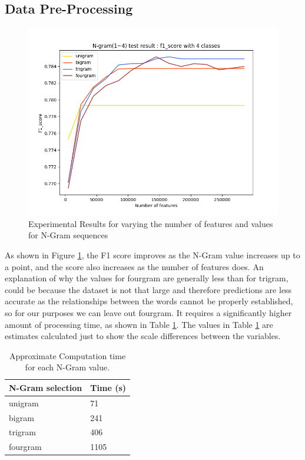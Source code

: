 \subsection{Data Pre-Processing}

\begin{figure}[h]
\centering
\includegraphics[scale=0.7]{graphs/nGramBinaryGraph300000.png}
\caption{Experimental Results for varying the number of features and values for N-Gram sequences}
\label{ngramGraph}
\end{figure}

As shown in Figure \ref{ngramGraph}, the F1 score improves as the N-Gram value increases up to a point, and the score also increases as the number of features does. An explanation of why the values for fourgram are generally less than for trigram, could be because the dataset is not that large and therefore predictions are less accurate as the relationships between the words cannot be properly established, so for our purposes we can leave out fourgram. It requires a significantly higher amount of processing time, as shown in Table \ref{ngram:time}. The values in Table \ref{ngram:time} are estimates calculated just to show the scale differences between the variables.

\begin{table}
\centering
\caption{Approximate Computation time for each N-Gram value.}
\begin{tabular}{ |p{3cm}|p{3cm}|}
 \hline
  N-Gram selection & Time (s) \\
 \hline
  unigram & 71\\
  bigram & 241\\
  trigram & 406\\
  fourgram & 1105 \\
 \hline
\end{tabular}
\label{ngram:time}
\end{table}
\pagebreak


